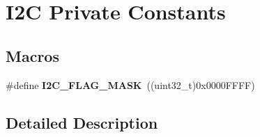 \hypertarget{group___i2_c___private___constants}{}\section{I2C Private Constants}
\label{group___i2_c___private___constants}
\subsection*{Macros}
\begin{DoxyCompactItemize}
\item 
\#define {\bfseries I2\+C\+\_\+\+F\+L\+A\+G\+\_\+\+M\+A\+SK}~((uint32\+\_\+t)0x0000\+F\+F\+F\+F)\hypertarget{group___i2_c___private___constants_gafbc0a6e4113be03100fbae1314a8b395}{}\label{group___i2_c___private___constants_gafbc0a6e4113be03100fbae1314a8b395}

\end{DoxyCompactItemize}


\subsection{Detailed Description}
